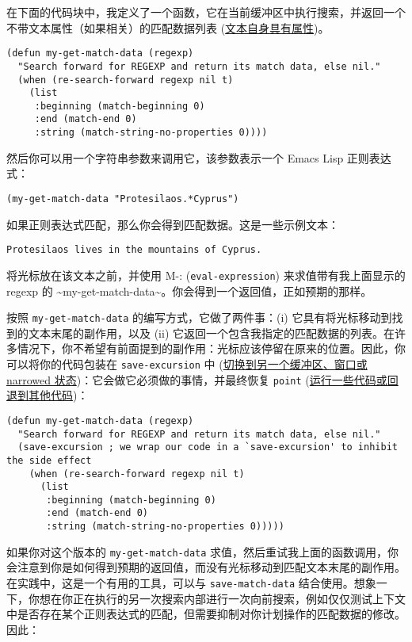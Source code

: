 \documentclass[11pt]{ctexart}
\begin{document}
在下面的代码块中，我定义了一个函数，它在当前缓冲区中执行搜索，并返回一个不带文本属性（如果相关）的匹配数据列表 (\hyperref[sec:orgea51fad]{文本自身具有属性})。

\begin{verbatim}
(defun my-get-match-data (regexp)
  "Search forward for REGEXP and return its match data, else nil."
  (when (re-search-forward regexp nil t)
    (list
     :beginning (match-beginning 0)
     :end (match-end 0)
     :string (match-string-no-properties 0))))
\end{verbatim}

然后你可以用一个字符串参数来调用它，该参数表示一个 Emacs Lisp 正则表达式：

\begin{verbatim}
(my-get-match-data "Protesilaos.*Cyprus")
\end{verbatim}

如果正则表达式匹配，那么你会得到匹配数据。这是一些示例文本：

\begin{verbatim}
Protesilaos lives in the mountains of Cyprus.
\end{verbatim}

将光标放在该文本之前，并使用 M-: (\texttt{eval-expression}) 来求值带有我上面显示的 regexp 的 \textasciitilde{}my-get-match-data\textasciitilde{}。你会得到一个返回值，正如预期的那样。

按照 \texttt{my-get-match-data} 的编写方式，它做了两件事：(i) 它具有将光标移动到找到的文本末尾的副作用，以及 (ii) 它返回一个包含我指定的匹配数据的列表。在许多情况下，你不希望有前面提到的副作用：光标应该停留在原来的位置。因此，你可以将你的代码包装在 \texttt{save-excursion} 中 (\hyperref[sec:org943a740]{切换到另一个缓冲区、窗口或 narrowed 状态})：它会做它必须做的事情，并最终恢复 \texttt{point} (\hyperref[sec:org16c56bc]{运行一些代码或回退到其他代码})：

\begin{verbatim}
(defun my-get-match-data (regexp)
  "Search forward for REGEXP and return its match data, else nil."
  (save-excursion ; we wrap our code in a `save-excursion' to inhibit the side effect
    (when (re-search-forward regexp nil t)
      (list
       :beginning (match-beginning 0)
       :end (match-end 0)
       :string (match-string-no-properties 0)))))
\end{verbatim}

如果你对这个版本的 \texttt{my-get-match-data} 求值，然后重试我上面的函数调用，你会注意到你是如何得到预期的返回值，而没有光标移动到匹配文本末尾的副作用。在实践中，这是一个有用的工具，可以与 \texttt{save-match-data} 结合使用。想象一下，你想在你正在执行的另一次搜索内部进行一次向前搜索，例如仅仅测试上下文中是否存在某个正则表达式的匹配，但需要抑制对你计划操作的匹配数据的修改。因此：
\end{document}
